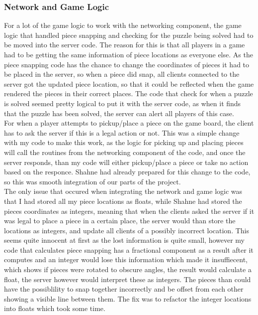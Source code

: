 \documentclass{article}
\begin{document}
\subsubsection{Network and Game Logic}
For a lot of the game logic to work with the networking component, the game
logic that handled piece snapping and checking for the puzzle being solved had
to be moved into the server code. The reason for this is that all players in a
game had to be getting the same information of piece locations as everyone
else. As the piece snapping code has the chance to change the coordinates of
pieces it had to be placed in the server, so when a piece did snap, all clients
connected to the server got the updated piece location, so that it could be
reflected when the game rendered the pieces in their correct places. The code
that check for when a puzzle is solved seemed pretty logical to put it with the
server code, as when it finds that the puzzle has been solved, the server can
alert all players of this case.\\

For when a player attempts to pickup/place a piece on the game board, the client
has to ask the server if this is a legal action or not. This was a simple change
with my code to make this work, as the logic for picking up and placing pieces
will call the routines from the networking component of the code, and once the
server responds, than my code will either pickup/place a piece or take no action
based on the responce. Shahne had already prepared for this change to the code,
so this was smooth integration of our parts of the project.\\

The only issue that occured when integrating the network and game logic was that
I had stored all my piece locations as floats, while Shahne had stored the
pieces coordinates as integers, meaning that when the clients asked the server
if it was legal to place a piece in a certain place, the server would than store
the locations as integers, and update all clients of a possibly incorrect
location. This seems quite innocent at first as the lost information is quite
small, however my code that calculates piece snapping has a fractional component
as a result after it computes and an integer would lose this information which
made it insuffiecent, which shows if pieces were rotated to obscure angles, the
result would calculate a float, the server however would interpret these as
integers. The pieces than could have the possiblility to snap together
incorrectly and be offset from each other showing a visible line between
them. The fix was to refactor the integer locations into floats which took some
time.
\end{document}
